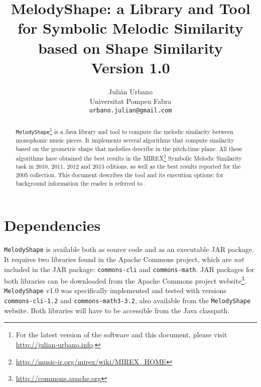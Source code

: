 \documentclass[twoside]{article}
\begin{document}
\title{\textbf{MelodyShape: a Library and Tool for Symbolic Melodic Similarity based on Shape Similarity\\{\Large Version 1.0}}}
\author{Juli\'an Urbano\\Universitat Pompeu Fabra\\\texttt{urbano.julian@gmail.com}}
\maketitle

\sloppy 

\begin{abstract}
\noindent\texttt{MelodyShape}\footnote{For the latest version of the software and this document, please visit \url{http://julian-urbano.info}.} is a Java library and tool to compute the melodic similarity between monophonic music pieces. It implements several algorithms that compute similarity based on the geometric shape that melodies describe in the pitch-time plane. All these algorithms have obtained the best results in the MIREX\footnote{\url{http://music-ir.org/mirex/wiki/MIREX_HOME}} Symbolic Melodic Similarity task in 2010, 2011, 2012 and 2013 editions, as well as the best results reported for the 2005 collection. This document describes the tool and its execution options; for background information the reader is referred to \cite{Urbano2011:shape}.
\end{abstract}

\section{Dependencies}

\texttt{MelodyShape} is available both as source code and as an executable JAR package. It requires two libraries found in the Apache Commons project, which are \emph{not} included in the JAR package: \texttt{commons-cli} and \texttt{commons-math}.
JAR packages for both libraries can be downloaded from the Apache Commons project website\footnote{\url{http://commons.apache.org}}. \texttt{MelodyShape} v1.0 was specifically implemented and tested with versions \texttt{commons-cli-1.2} and \texttt{commons-math3-3.2}, also available from the \texttt{MelodyShape} website.
Both libraries will have to be accessible from the Java classpath.
\end{document}
